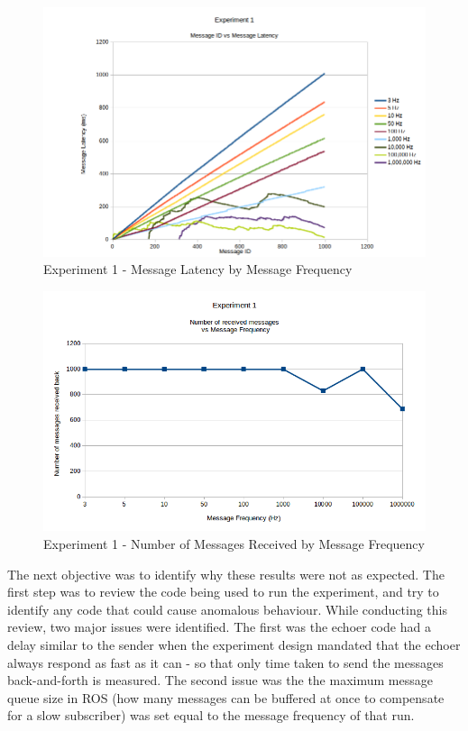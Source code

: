 \documentclass[../dissertation.tex]{subfiles}
\begin{document}
\begin{figure}[H]
\centering
\includegraphics[width=\textwidth]{images/experiment1/msgid_msglatency_all_freqs_version_1.png}
\caption{Experiment 1 - Message Latency by Message Frequency}
\label{exp1-all-freqs}
\end{figure}

\begin{figure}[H]
\centering
\includegraphics[width=\textwidth]{images/experiment1/original-messages-dropped.png}
\caption{Experiment 1 - Number of Messages Received by Message Frequency}
\label{exp1-dropped-messages}
\end{figure}

The next objective was to identify why these results were not as expected. The first step was to review the code being used to run the experiment, and try to identify any code that could cause anomalous behaviour. While conducting this review, two major issues were identified. The first was the echoer code had a delay similar to the sender when the experiment design mandated that the echoer always respond as fast as it can - so that only time taken to send the messages back-and-forth is measured. The second issue was the the maximum message queue size in ROS (how many messages can be buffered at once to compensate for a slow subscriber) was set equal to the message frequency of that run.
\end{document}

